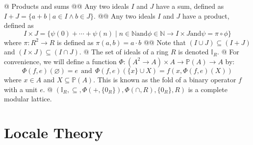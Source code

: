 \documentclass[]{article}
\newcommand{\textbs}[1]{{\sffamily\fontseries{sbc}\selectfont #1}}
\newcommand{\mbb}[1]{\ensuremath{\mathbb{#1}}}     %
\newcommand{\rmand}{\ensuremath{\mathrel{\mathrm{and}}}}
\newcommand{\comp}[0]{\circ}
\newcommand{\define}[1]{\textbs{#1}}
\begin{document}
\begin{easylist}[itemize]
{}
@ Products and sums
@@ {%
  Any two ideals $I$ and $J$ have a sum, defined as
  $I + J = \{a + b \mid a \in I \land b \in J\}$.
}
@@ {%
  Any two ideals $I$ and $J$ have a product, defined as
  \begin{equation*}
  I \times J = \{
    \psi(0) + \cdots + \psi(n)
    \mid   n \in \mbb{N}
    \rmand \phi \in \mbb{N} \to I \times J
    \rmand \psi = \pi \comp \phi
  \}
  \end{equation*}
  where $\pi : R^2 \to R$ is defined as $\pi(a, b) = a \cdot b$
}
@@ {%
  Note that $(I \cup J) \subseteq (I + J)$
  and $(I \times J) \subseteq (I \cap J)$.
}
@ The set of ideals of a ring $R$ is denoted $\mbb{I}_R$.
@ {%
  For convenience, we will define a function
  $\Phi : (A^2 \to A) \times A \to \mbb{P}(A) \to A$ by:
  \begin{equation*}
    {\Phi(f, e)(\varnothing) = e}
    ~ ~ \rmand ~ ~
    {\Phi(f, e)(\{x\} \cup X) = f(x, \Phi(f, e)(X))}
  \end{equation*}
  where $x \in A$ and $X \subseteq \mbb{P}(A)$.
  This is known as the \define{fold} of a binary operator $f$ with a unit $e$.
}
@ {%
  $(\mbb{I}_R, \subseteq, \Phi(+, \{0_R\}), \Phi(\cap, R), \{0_R\}, R)$
  is a complete modular lattice.
}
\end{easylist}


\section{Locale Theory}
\end{document}
